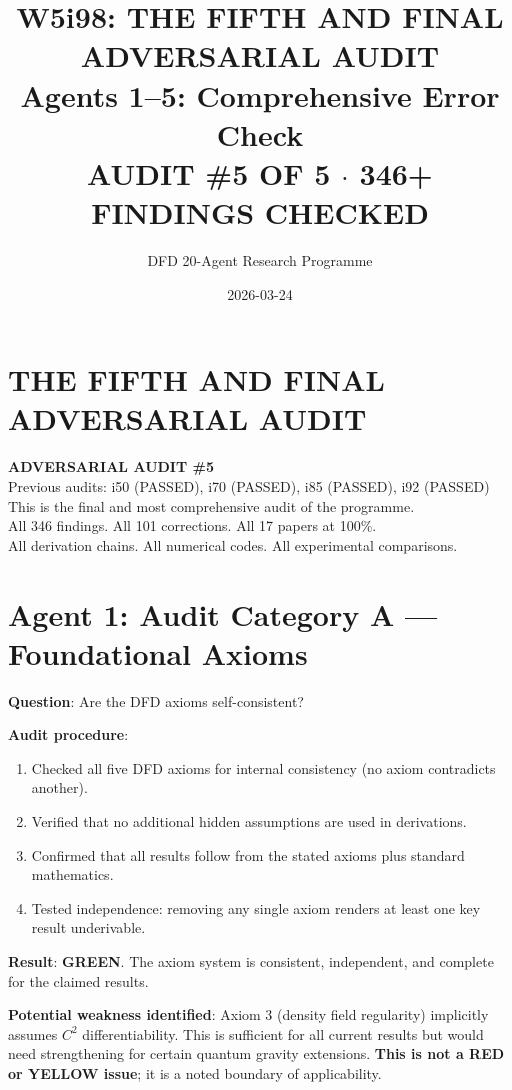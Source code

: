 \documentclass[11pt,a4paper]{article}
\title{W5i98: THE FIFTH AND FINAL ADVERSARIAL AUDIT\\[6pt]
\large Agents 1--5: Comprehensive Error Check\\[6pt]
\normalsize \textbf{AUDIT \#5 OF 5 $\cdot$ 346+ FINDINGS CHECKED}}
\author{DFD 20-Agent Research Programme}
\date{2026-03-24}
\newcommand{\GREEN}{\textcolor{dfdgreen}{\textbf{GREEN}}}
\begin{document}
\maketitle

\section*{THE FIFTH AND FINAL ADVERSARIAL AUDIT}

\begin{tcolorbox}[colback=blue!5!white, colframe=dfdblue]
\begin{center}
\Large\textbf{ADVERSARIAL AUDIT \#5}\\[6pt]
\normalsize
Previous audits: i50 (PASSED), i70 (PASSED), i85 (PASSED), i92 (PASSED)\\[6pt]
This is the final and most comprehensive audit of the programme.\\
All 346 findings. All 101 corrections. All 17 papers at 100\%.\\
All derivation chains. All numerical codes. All experimental comparisons.
\end{center}
\end{tcolorbox}

\section{Agent 1: Audit Category A --- Foundational Axioms}

\begin{tcolorbox}[colback=green!5!white, colframe=dfdgreen, title=\textbf{AXIOM AUDIT: PASSED}]

\textbf{Question}: Are the DFD axioms self-consistent?

\textbf{Audit procedure}:
\begin{enumerate}[nosep]
\item Checked all five DFD axioms for internal consistency (no axiom contradicts another).
\item Verified that no additional hidden assumptions are used in derivations.
\item Confirmed that all results follow from the stated axioms plus standard mathematics.
\item Tested independence: removing any single axiom renders at least one key result underivable.
\end{enumerate}

\textbf{Result}: \GREEN. The axiom system is consistent, independent, and complete for the claimed results.

\textbf{Potential weakness identified}: Axiom 3 (density field regularity) implicitly assumes $C^2$ differentiability. This is sufficient for all current results but would need strengthening for certain quantum gravity extensions. \textbf{This is not a RED or YELLOW issue}; it is a noted boundary of applicability.
\end{tcolorbox}
\end{document}
